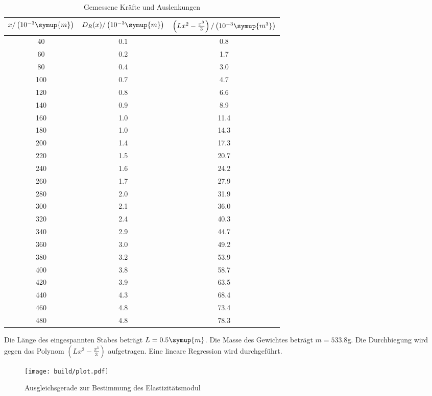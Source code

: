 \begin{table}[H]
  \centering
  \caption{Gemessene Kräfte und Auslenkungen}
  \label{tab:Parameter}
  \begin{tabular}{c c c}
    \toprule
    $x/\left(10^{-3}\symup{m}\right)$ & $D_R(x)/\left(10^{-3}\symup{m}\right)$ & $\left(Lx^2 -\frac{x^3}{3}\right)/\left(10^{-3}\symup{m^3}\right)$\\
    \midrule
     40 & 0.1 &  0.8 \\
     60 & 0.2 &  1.7 \\
     80 & 0.4 &  3.0 \\
    100 & 0.7 &  4.7 \\
    120 & 0.8 &  6.6 \\
    140 & 0.9 &  8.9 \\
    160 & 1.0 & 11.4 \\
    180 & 1.0 & 14.3 \\
    200 & 1.4 & 17.3 \\
    220 & 1.5 & 20.7 \\
    240 & 1.6 & 24.2 \\
    260 & 1.7 & 27.9 \\
    280 & 2.0 & 31.9 \\
    300 & 2.1 & 36.0 \\
    320 & 2.4 & 40.3 \\
    340 & 2.9 & 44.7 \\
    360 & 3.0 & 49.2 \\
    380 & 3.2 & 53.9 \\
    400 & 3.8 & 58.7 \\
    420 & 3.9 & 63.5 \\
    440 & 4.3 & 68.4 \\
    460 & 4.8 & 73.4 \\
    480 & 4.8 & 78.3 \\
    \bottomrule
  \end{tabular}
\end{table}

Die Länge des eingespannten Stabes beträgt $L = 0.5 \symup{m}$. Die Masse des
Gewichtes beträgt $m = 533.8$g.
Die Durchbiegung wird gegen das Polynom $\left(Lx^2 -\frac{x^3}{3}\right)$ aufgetragen. Eine
lineare Regression wird durchgeführt.

\begin{figure}[H]
  \centering
  \texttt{[image: build/plot.pdf]}
  \caption{Ausgleichsgerade zur Bestimmung des Elastizitätsmodul}
  \label{fig:Elastizitätsmodul}
\end{figure}

